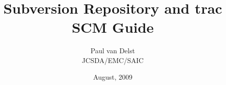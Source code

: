 



\newcommand{\f}[1]{\texttt{#1}}
\newcommand{\subversion}{\href{http://subversion.tigris.org/}{subversion}}
\newcommand{\trac}{\href{http://trac.edgewall.org/}{\textsf{trac}}}

\title{Subversion Repository and trac SCM Guide}
\author{Paul van Delst\\JCSDA/EMC/SAIC}
\date{August, 2009}



\maketitle


\setcounter{page}{1}
  \tableofcontents\newpage
  \listoffigures\newpage
  \listoftables\newpage
{}
\setcounter{page}{1}






\clearpage



\begin{appendix}
\end{appendix}



